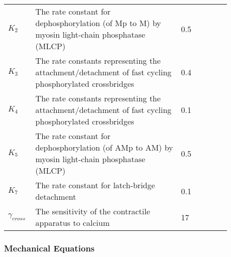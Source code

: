 \begin{table}[h!]
\centering
\begin{tabular}{| p{0.09\linewidth} | >{\footnotesize} p{0.6\linewidth} | >{\footnotesize} p{0.17\linewidth} | >{\footnotesize} p{0.02\linewidth} |}
\arrayrulecolor{lightgrey}\hline
$K_{2}$      	& The rate constant for dephosphorylation (of Mp to M) by myosin light-chain phosphatase (MLCP)																			 & 0.5 \pers & \cite{Hai1989} \\
$K_{3}$      	& The rate constants representing the attachment/detachment of fast cycling phosphorylated crossbridges																	 & 0.4 \pers	& \cite{Hai1989} \\
$K_{4}$      	& The rate constants representing the attachment/detachment of fast cycling phosphorylated crossbridges 																	 & 0.1 \pers	& \cite{Hai1989} \\
$K_{5}$      & The rate constant for dephosphorylation (of AMp to AM) by myosin light-chain phosphatase (MLCP)																			 & 0.5 \pers	& \cite{Hai1989} \\
$K_{7}$      	& The rate constant for latch-bridge detachment					& 0.1 \pers	& \cite{Hai1989} \\
$\gamma_{cross}$      	& The sensitivity of the contractile apparatus to calcium		& 17 \puMdries	& \cite{Hai1989} \\
\hline
\end{tabular}
\label{tab:crossbridge}
\end{table}
\newpage
\subsubsection{Mechanical Equations}


